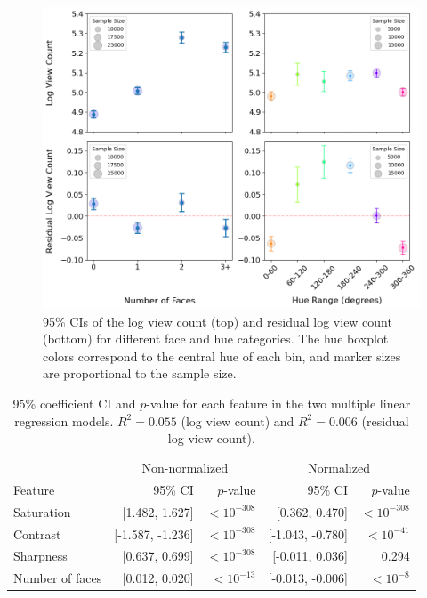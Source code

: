 \documentclass{article}
\begin{document}
\begin{figure}[h]
  \begin{minipage}[t]{0.45\textwidth}
    \vspace{0pt}  %
    \includegraphics[width=\textwidth]{figs/faces-and-hue.png}
  \end{minipage}%
  \hspace{0.1\textwidth}%
  \begin{minipage}[t]{0.45\textwidth}
    \vspace{0pt}  %
    \caption{95\% CIs of the log view count (top) and residual log view count (bottom) for different face and hue categories. The hue boxplot colors correspond to the central hue of each bin, and marker sizes are proportional to the sample size.} 
    \label{fig:faces-and-hue}
  \end{minipage}
\end{figure}

\begin{table}[h]
\centering
\begin{tabular}{lrrrr}
\toprule
& \multicolumn{2}{c}{Non-normalized} & \multicolumn{2}{c}{Normalized} \\
\cmidrule(lr){2-3} \cmidrule(lr){4-5}
Feature & 95\% CI & $p$-value & 95\% CI & $p$-value \\
\midrule
Saturation & [1.482, 1.627] & $<10^{-308}$ & [0.362, 0.470] & $<10^{-308}$ \\

Contrast & [-1.587, -1.236] & $<10^{-308}$ & [-1.043, -0.780] & $<10^{-41}$ \\
Sharpness & [0.637, 0.699] & $<10^{-308}$ & [-0.011, 0.036] & 0.294 \\
Number of faces & [0.012, 0.020] & $<10^{-13}$ & [-0.013, -0.006] & $<10^{-8}$ \\
\bottomrule
\end{tabular}
\vspace{\baselineskip}
\caption{95\% coefficient CI and $p$-value for each feature in the two multiple linear regression models. $R^2 = 0.055$ (log view count) and $R^2 = 0.006$ (residual log view count).}
\label{tab:regression}
\end{table}
\end{document}
